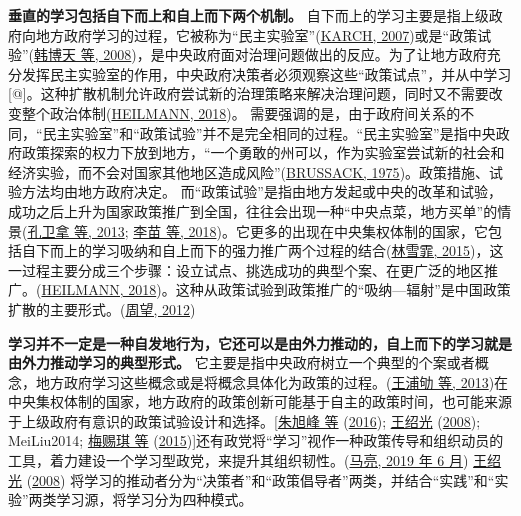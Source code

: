 \documentclass[
  12pt,
]{ctexart}
\begin{document}
\textbf{垂直的学习包括自下而上和自上而下两个机制。}
自下而上的学习主要是指上级政府向地方政府学习的过程，它被称为``民主实验室''(\protect\hyperlink{ref-Karch2007}{KARCH, 2007})或是``政策试验''(\protect\hyperlink{ref-HanBoTianShiLei2008}{韩博天 等, 2008})，是中央政府面对治理问题做出的反应。为了让地方政府充分发挥民主实验室的作用，中央政府决策者必须观察这些``政策试点''，并从中学习{[}@{]}。这种扩散机制允许政府尝试新的治理策略来解决治理问题，同时又不需要改变整个政治体制(\protect\hyperlink{ref-Heilmann2018}{HEILMANN, 2018})。
需要强调的是，由于政府间关系的不同，``民主实验室''和``政策试验''并不是完全相同的过程。``民主实验室''是指中央政府政策探索的权力下放到地方，``一个勇敢的州可以，作为实验室尝试新的社会和经济实验，而不会对国家其他地区造成风险''(\protect\hyperlink{ref-Brussack1975}{BRUSSACK, 1975})。政策措施、试验方法均由地方政府决定。
而``政策试验''是指由地方发起或中央的改革和试验，成功之后上升为国家政策推广到全国，往往会出现一种``中央点菜，地方买单''的情景(\protect\hyperlink{ref-KongWeiNaZhangGuang2013}{孔卫拿 等, 2013}; \protect\hyperlink{ref-LiMiaoCuiJun2018}{李苗 等, 2018})。它更多的出现在中央集权体制的国家，它包括自下而上的学习吸纳和自上而下的强力推广两个过程的结合(\protect\hyperlink{ref-LinXueFei2015}{林雪霏, 2015})，这一过程主要分成三个步骤：设立试点、挑选成功的典型个案、在更广泛的地区推广。(\protect\hyperlink{ref-Heilmann2018}{HEILMANN, 2018})。这种从政策试验到政策推广的``吸纳---辐射''是中国政策扩散的主要形式。(\protect\hyperlink{ref-ZhouWang2012}{周望, 2012})

\textbf{学习并不一定是一种自发地行为，它还可以是由外力推动的，自上而下的学习就是由外力推动学习的典型形式。}
它主要是指中央政府树立一个典型的个案或者概念，地方政府学习这些概念或是将概念具体化为政策的过程。(\protect\hyperlink{ref-WangPuQuLaiXianJin2013}{王浦劬 等, 2013})在中央集权体制的国家，地方政府的政策创新可能基于自主的政策时间，也可能来源于上级政府有意识的政策试验设计和选择。{[}\protect\hyperlink{ref-ZhuXuFengZhaoHui2016}{朱旭峰 等} (\protect\hyperlink{ref-ZhuXuFengZhaoHui2016}{2016}); \protect\hyperlink{ref-WangShaoGuang2008a}{王绍光} (\protect\hyperlink{ref-WangShaoGuang2008a}{2008}); MeiLiu2014; \protect\hyperlink{ref-MeiSiQiEtAl2015}{梅赐琪 等} (\protect\hyperlink{ref-MeiSiQiEtAl2015}{2015}){]}还有政党将``学习''视作一种政策传导和组织动员的工具，着力建设一个学习型政党，来提升其组织韧性。(\protect\hyperlink{ref-MaLiang2019}{马亮, 2019 年 6 月})
\protect\hyperlink{ref-WangShaoGuang2008a}{王绍光} (\protect\hyperlink{ref-WangShaoGuang2008a}{2008}) 将学习的推动者分为``决策者''和``政策倡导者''两类，并结合``实践''和``实验''两类学习源，将学习分为四种模式。
\end{document}
